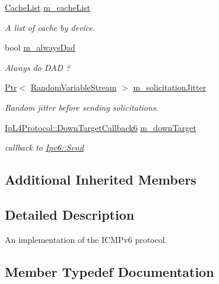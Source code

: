 \begin{DoxyCompactItemize}
\hyperlink{classns3_1_1Icmpv6L4Protocol_ac7bab2dfb09ca225828e92673c9e3b11}{Cache\+List} \hyperlink{classns3_1_1Icmpv6L4Protocol_af48a7cf3be7bc3d413c9302b10314244}{m\+\_\+cache\+List}
\begin{DoxyCompactList}\small\item\em A list of cache by device. \end{DoxyCompactList}\item 
bool \hyperlink{classns3_1_1Icmpv6L4Protocol_aa21acf24e3acd05c073c0b15d94b6759}{m\+\_\+always\+Dad}
\begin{DoxyCompactList}\small\item\em Always do D\+AD ? \end{DoxyCompactList}\item 
\hyperlink{classns3_1_1Ptr}{Ptr}$<$ \hyperlink{classns3_1_1RandomVariableStream}{Random\+Variable\+Stream} $>$ \hyperlink{classns3_1_1Icmpv6L4Protocol_ac7e4a25978a861e34cef7bdd27efb1d9}{m\+\_\+solicitation\+Jitter}
\begin{DoxyCompactList}\small\item\em Random jitter before sending solicitations. \end{DoxyCompactList}\item 
\hyperlink{classns3_1_1IpL4Protocol_a039f3d1883632ab922fa958fc9ecd97f}{Ip\+L4\+Protocol\+::\+Down\+Target\+Callback6} \hyperlink{classns3_1_1Icmpv6L4Protocol_a8cd5beb542044689be316d6e6963bb3a}{m\+\_\+down\+Target}
\begin{DoxyCompactList}\small\item\em callback to \hyperlink{classns3_1_1Ipv6_a2aad308983b20eb54334bb0d3db31004}{Ipv6\+::\+Send} \end{DoxyCompactList}\end{DoxyCompactItemize}
\subsection*{Additional Inherited Members}


\subsection{Detailed Description}
An implementation of the I\+C\+M\+Pv6 protocol. 

\subsection{Member Typedef Documentation}
